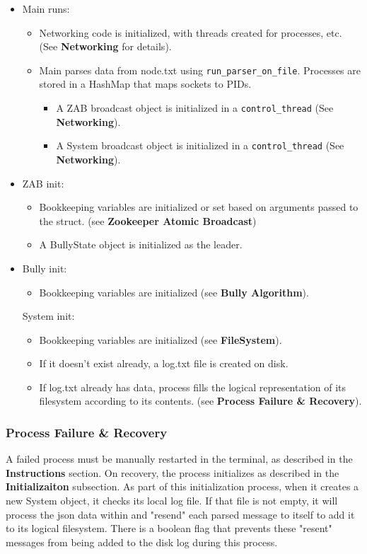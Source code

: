 \documentclass{article}
\begin{document}
\begin{itemize}
	\item
	    Main runs:
	    \begin{itemize}
	    	\item Networking code is initialized, with threads created for processes, etc. (See \textbf{Networking} for details).
	        \item Main parses data from node.txt using \verb|run_parser_on_file|. Processes are stored in a HashMap that maps sockets to PIDs. 
	        \begin{itemize}
	            \item A ZAB broadcast object is initialized in a \verb|control_thread| (See \textbf{Networking}).
	            \item A System broadcast object is initialized in a \verb|control_thread| (See \textbf{Networking}).
	        \end{itemize}
	    \end{itemize}
	\item
	    ZAB init:
	    \begin{itemize}
	    	\item Bookkeeping variables are initialized or set based on arguments passed to the struct. (see \textbf{Zookeeper Atomic Broadcast}) 
	        \item A BullyState object is initialized as the leader.
	    \end{itemize}
	\item
	    Bully init:
	    \begin{itemize}
	        \item Bookkeeping variables are initialized (see \textbf{Bully Algorithm}).
	    \end{itemize}

	    System init:
	    \begin{itemize}
	        \item Bookkeeping variables are initialized (see \textbf{FileSystem}).
	        \item If it doesn't exist already, a log.txt file is created on disk.
	        \item If log.txt already has data, process fills the logical representation of its filesystem according to its contents. (see \textbf{Process Failure \& Recovery}).
	    \end{itemize}
	\end{itemize}

    \subsubsection*{Process Failure \& Recovery}
        A failed process must be manually restarted in the terminal, as described in the \textbf{Instructions} section. On recovery, the process initializes as described in the \textbf{Initializaiton} subsection. As part of this initialization process, when it creates a new System object, it checks its local log file. If that file is not empty, it will process the json data within and "resend" each parsed message to itself to add it to its logical filesystem. There is a boolean flag that prevents these "resent" messages from being added to the disk log during this process.
\end{document}
